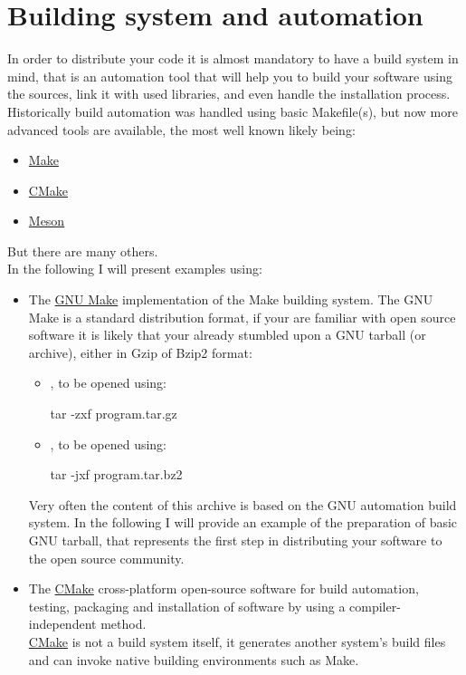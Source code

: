 \chapter{Building system and automation}

In order to distribute your code it is almost mandatory to have a build system in mind, that is an automation tool that will help you to build your software using the sources, link it with used libraries, and even handle the installation process. \\
Historically build automation was handled using basic Makefile(s), but now more advanced tools are available, the most well known likely being:
\begin{itemize}
\item \href{https://en.wikipedia.org/wiki/Make\_(software)}{Make} 
\item \href{https://en.wikipedia.org/wiki/CMake}{CMake}
\item \href{https://en.wikipedia.org/wiki/Meson\_(software)}{Meson}
\end{itemize}
But there are many others. \\
In the following I will present examples using:
\begin{itemize}
\item The \href{https://www.gnu.org/software/make/}{GNU Make} implementation of the Make building system. 
The GNU Make is a standard distribution format, if your are familiar with open source software it is likely that your already stumbled upon a GNU tarball (or archive), 
either in Gzip of Bzip2 format:
\begin{itemize}
\item {}, to be opened using: \begin{script}\fprompt{~} tar -zxf program.tar.gz\end{script}
\item {}, to be opened using: \begin{script}\fprompt{~} tar -jxf program.tar.bz2\end{script}
\end{itemize}
Very often the content of this archive is based on the GNU automation build system. 
In the following I will provide an example of the preparation of basic GNU tarball, that represents the first step in distributing your software to the open source community.
\item The \href{https://cmake.org/}{CMake} cross-platform open-source software for build automation, testing, packaging and installation of software by using a compiler-independent method. \\
\href{https://cmake.org/}{CMake} is not a build system itself, it generates another system's build files and can invoke native building environments such as Make. 
\end{itemize}

